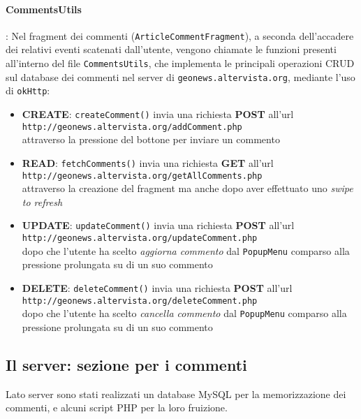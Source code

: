 \documentclass[12pt]{article}
\def\code#1{\texttt{#1}}
\begin{document}
\paragraph{CommentsUtils}: Nel fragment dei commenti (\code{ArticleCommentFragment}), a seconda dell'accadere dei relativi eventi scatenati dall'utente, vengono chiamate le funzioni presenti all'interno del file \code{CommentsUtils}, che implementa le principali operazioni CRUD sul database dei commenti nel server di \code{geonews.altervista.org}, mediante l'uso di \code{okHttp}:
\begin{itemize}
\item\textbf{CREATE}: \code{createComment()} invia una richiesta \textbf{POST} all'url \\\code{http://geonews.altervista.org/addComment.php} \\attraverso la pressione del bottone per inviare un commento
\item\textbf{READ}: \code{fetchComments()} invia una richiesta \textbf{GET} all'url \\\code{http://geonews.altervista.org/getAllComments.php} \\attraverso la creazione del fragment ma anche dopo aver effettuato uno \textit{swipe to refresh}
\item\textbf{UPDATE}: \code{updateComment()} invia una richiesta \textbf{POST} all'url \\\code{http://geonews.altervista.org/updateComment.php} \\dopo che l'utente ha scelto \textit{aggiorna commento} dal \code{PopupMenu} comparso alla pressione prolungata su di un suo commento
\item\textbf{DELETE}: \code{deleteComment()} invia una richiesta \textbf{POST} all'url \\\code{http://geonews.altervista.org/deleteComment.php} \\dopo che l'utente ha scelto \textit{cancella commento} dal \code{PopupMenu} comparso alla pressione prolungata su di un suo commento
\end{itemize}
\newpage

\subsection{Il server: sezione per i commenti}
Lato server sono stati realizzati un database MySQL per la memorizzazione dei commenti, e alcuni script PHP per la loro fruizione.\\
\end{document}
